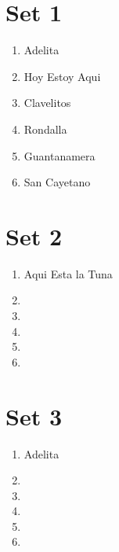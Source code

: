 \documentclass{article}
\begin{document}
\thispagestyle{empty}
\vspace*{\fill}

\begin{multicols}{3}
\section*{Set 1}
\begin{enumerate}[leftmargin=*]
\item Adelita
\item Hoy Estoy Aqui
\item Clavelitos
\item Rondalla
\item Guantanamera
\item San Cayetano
\end{enumerate}

\columnbreak
\section*{Set 2}
\begin{enumerate}[leftmargin=*]
\item Aqui Esta la Tuna
\item 
\item 
\item 
\item 
\item 
\end{enumerate}

\columnbreak
\section*{Set 3}
\begin{enumerate}[leftmargin=*]
\item Adelita
\item 
\item 
\item 
\item 
\item 
\end{enumerate}
\end{multicols}
\vspace*{\fill}
\end{document}
